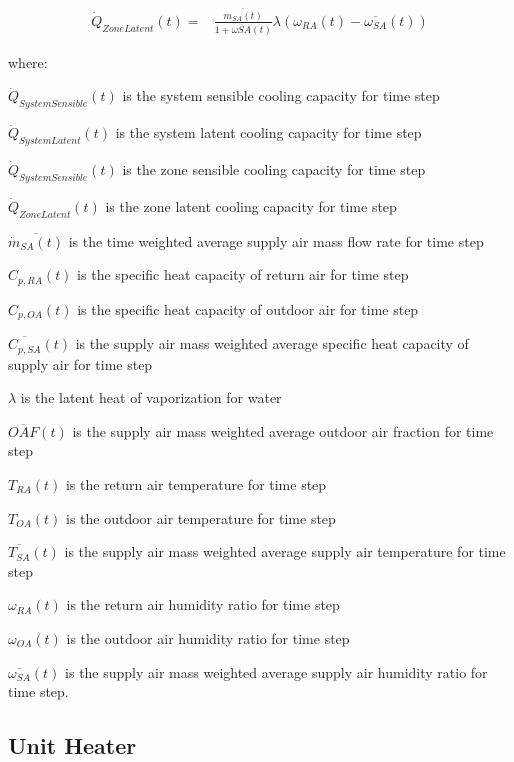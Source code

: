 \begin{align}
	\dot{Q}_{ZoneLatent}(t) = & \frac{\overline{\dot{m}_{SA}(t)}}{1+\overline{\omega{SA}}(t)}\lambda\left(\omega_{RA}(t)-\overline{\omega_{SA}}(t)\right)
\end{align}

where:

\item $\dot{Q}_{SystemSensible}(t)$ is the system sensible cooling capacity for time step
\item $\dot{Q}_{SystemLatent}(t)$ is the system latent cooling capacity for time step
\item $\dot{Q}_{SystemSensible}(t)$ is the zone sensible cooling capacity for time step
\item $\dot{Q}_{ZoneLatent}(t)$ is the zone latent cooling capacity for time step
\item $\overline{\dot{m}_{SA}(t)}$ is the time weighted average supply air mass flow rate for time step
\item $C_{p,RA}(t)$ is the specific heat capacity of return air for time step
\item $C_{p,OA}(t)$ is the specific heat capacity of outdoor air for time step
\item $\overline{C_{p,SA}}(t)$ is the supply air mass weighted average specific heat capacity of supply air for time step
\item $\lambda$ is the latent heat of vaporization for water
\item $\overline{OAF}(t)$ is the supply air mass weighted average outdoor air fraction for time step
\item $T_{RA}(t)$ is the return air temperature for time step
\item $T_{OA}(t)$ is the outdoor air temperature for time step
\item $\overline{T_{SA}}(t)$ is the supply air mass weighted average supply air temperature for time step
\item $\omega_{RA}(t)$ is the return air humidity ratio for time step
\item $\omega_{OA}(t)$ is the outdoor air humidity ratio for time step
\item $\overline{\omega_{SA}}(t)$ is the supply air mass weighted average supply air humidity ratio for time step.

\subsection{Unit Heater}\label{unit-heater}

